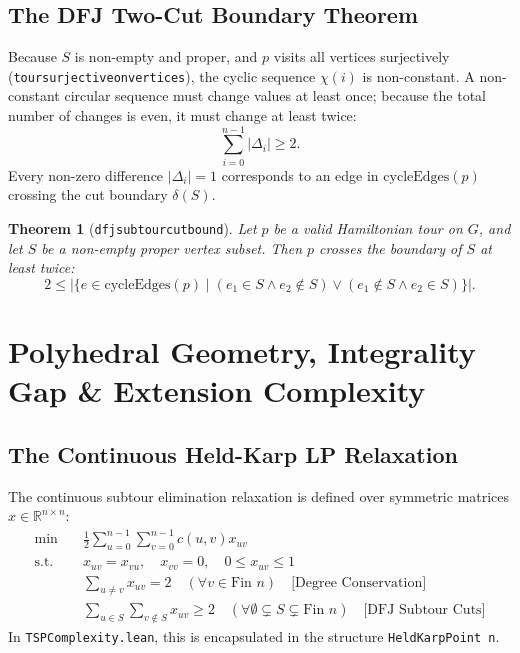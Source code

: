 \documentclass[11pt,a4paper]{article}
\renewcommand{\_}{\origunderscore\allowbreak}
\theoremstyle{plain}
\newtheorem{theorem}{Theorem}[section]
\theoremstyle{definition}
\theoremstyle{remark}
\begin{document}
\subsection{The DFJ Two-Cut Boundary Theorem}
Because $S$ is non-empty and proper, and $p$ visits all vertices surjectively (\texttt{tour\_surjective\_on\_vertices}), the cyclic sequence $\chi(i)$ is non-constant. A non-constant circular sequence must change values at least once; because the total number of changes is even, it must change at least twice:
\begin{equation}
  \sum_{i=0}^{n-1} |\Delta_i| \ge 2.
\end{equation}
Every non-zero difference $|\Delta_i| = 1$ corresponds to an edge in $\text{cycleEdges}(p)$ crossing the cut boundary $\delta(S)$.

\begin{theorem}[\texttt{dfj\_subtour\_cut\_bound}]
Let $p$ be a valid Hamiltonian tour on $G$, and let $S$ be a non-empty proper vertex subset. Then $p$ crosses the boundary of $S$ at least twice:
\begin{equation*}
  2 \le \left|\{ e \in \text{cycleEdges}(p) \mid (e_1 \in S \land e_2 \notin S) \lor (e_1 \notin S \land e_2 \in S) \}\right|.
\end{equation*}
\end{theorem}

\section{Polyhedral Geometry, Integrality Gap \& Extension Complexity}

\subsection{The Continuous Held-Karp LP Relaxation}
The continuous subtour elimination relaxation is defined over symmetric matrices $x \in \mathbb{R}^{n \times n}$:
\begin{align}
\min \quad & \frac{1}{2} \sum_{u=0}^{n-1} \sum_{v=0}^{n-1} c(u, v) x_{uv} \nonumber \\
\text{s.t.} \quad & x_{uv} = x_{vu}, \quad x_{vv} = 0, \quad 0 \le x_{uv} \le 1 \nonumber \\
& \sum_{u \ne v} x_{uv} = 2 \quad (\forall v \in \text{Fin } n) \quad \text{[Degree Conservation]} \label{eq:hk_deg} \\
& \sum_{u \in S} \sum_{v \notin S} x_{uv} \ge 2 \quad (\forall \emptyset \subsetneq S \subsetneq \text{Fin } n) \quad \text{[DFJ Subtour Cuts]} \label{eq:hk_cut}
\end{align}
In \texttt{TSP\allowbreak Complexity.\allowbreak lean}, this is encapsulated in the structure \texttt{HeldKarpPoint n}.
\end{document}
